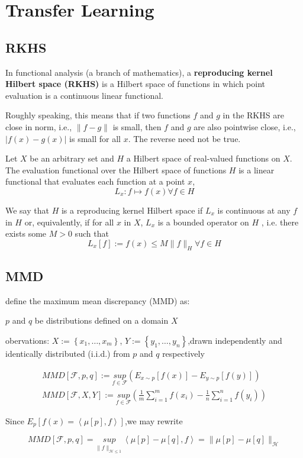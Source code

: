\chapter{Transfer Learning}
\section{RKHS}\cite{RKHS}
In functional analysis (a branch of mathematics), a \textbf{reproducing kernel Hilbert space (RKHS)} is a Hilbert space of functions in which point evaluation is a continuous linear functional.\par
Roughly speaking, this means that if two functions $f$ and $g$ in the RKHS are close in norm, i.e., $\|f-g\|$ is small, then $f$ and $g$ are also pointwise close, i.e., $|f(x)-g(x)|$ is small for all $x$. The reverse need not be true. \par
Let $X$ be an arbitrary set and $H$ a Hilbert space of real-valued functions on $X$. The evaluation functional over the Hilbert space of functions $H$ is a linear functional that evaluates each function at a point $x$,
\[ L_x : f \mapsto f(x) \forall f \in H \]

We say that $H$ is a reproducing kernel Hilbert space if $L_x$ is continuous at any $f$ in $H$ or, equivalently, if for all $x$ in $X$, $L_x$ is a bounded operator on $H$ , i.e. there exists some $M > 0$ such that
\[ L_x [f]:= f(x)\leq M	\|f\|_H \forall f \in H \] 

\section{MMD}\cite{MMD}
define the maximum mean discrepancy (MMD) as:\par
$p$ and $q$ be distributions defined on a domain $X$ \par
obervations: $X:=\left\lbrace x_1,\dots,x_m \right\rbrace $,
$Y:=\left\lbrace y_1,\dots,y_n \right\rbrace $,drawn independently and identically distributed (i.i.d.) from
$p$ and $q$ respectively

\begin{align}
MMD[\mathcal{F},p,q] := \underset{f\in \mathcal{F}}{sup} \left( E_{x\sim p } [f(x)] - E_{y\sim p } [f(y)] \right) \\
MMD[\mathcal{F},X,Y] := \underset{f\in \mathcal{F}}{sup} \left( \frac{1}{m} \sum_{i=1}^m f(x_i) - \frac{1}{n} \sum_{i=1}^n f(y_i)\right) 
\end{align}

Since $E_p[f(x)=\left\langle \mu[p],f\right\rangle]$,we may rewrite\par
\[ MMD[\mathcal{F},p,q]=\underset{\|f\|_{\mathcal{H} \leq 1}}{sup} \left\langle \mu[p] - \mu[q],f\right\rangle = \|\mu[p] - \mu [q]\|_{\mathcal{H}}\]

